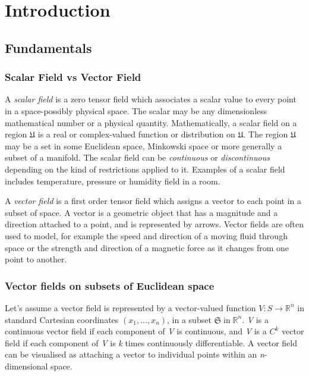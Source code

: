 \chapter{Introduction}


\section{Fundamentals}


\subsection{Scalar Field vs Vector Field}
A \textit{scalar field} is a zero tensor field which associates a scalar value to every point in a space-possibly physical space. The scalar may be any dimensionless mathematical number or a physical quantity. Mathematically, a scalar field on a region $\mathfrak{U}$ is a real or complex-valued function or distribution on $\mathfrak{U}$. The region $\mathfrak{U}$ may be a set in some Euclidean space, Minkowski space or more generally a subset of a manifold. The scalar field can be \textit{continuous} or \textit{discontinuous} depending on the kind of restrictions applied to it. Examples of a scalar field includes temperature, pressure or humidity field in a room. 

A \textit{vector field} is a first order tensor field which assigns a vector to each point in a subset of space. A vector is a geometric object that has a magnitude and a direction attached to a point, and is represented by arrows. Vector fields are often used to model, for example the speed and direction of a moving fluid through space or the strength and direction of a magnetic force as it changes from one point to another.

\subsection{Vector fields on subsets of Euclidean space}
Let's assume a vector field is represented by a vector-valued function $ V: S\rightarrow \mathbb{R}^{n}$ in standard Cartesian coordinates $(x_{1},\ldots, x_{n})$, in a subset $\mathfrak{S} \; \text{in} \; \mathbb{R}^{n}$. \textit{V} is a continuous vector field if each component of \textit{V} is continuous, and \textit{V} is a $C^{k} $ vector field if each component of \textit{V} is \textit{k} times continuously differentiable. A vector field can be visualised as attaching a vector to individual points within an \textit{n}-dimensional space.

